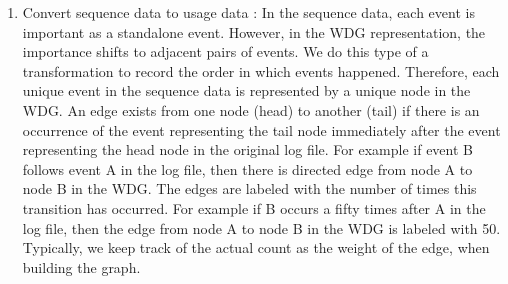                 \begin{enumerate}
                \item Convert sequence data to usage data :
In the sequence data, each event is important as a standalone event. However, in the WDG representation, the importance shifts to adjacent pairs of events. We do this type of a transformation to record the order in which events happened. Therefore, each unique event in the sequence data is represented by a unique node in the WDG. An edge exists from one node (head) to another (tail) if there is an occurrence of the event representing the tail node immediately after the event representing the head node in the original log file. For example if event B follows event A in the log file, then there is directed edge from node A to node B in the WDG. The edges are labeled with the number of times this transition has occurred.  For example if B occurs a fifty times after A in the log file, then the edge from node A to node B in the WDG is labeled with 50. Typically, we keep track of the actual count as the weight of the edge, when building the graph. 



\end{enumerate}
